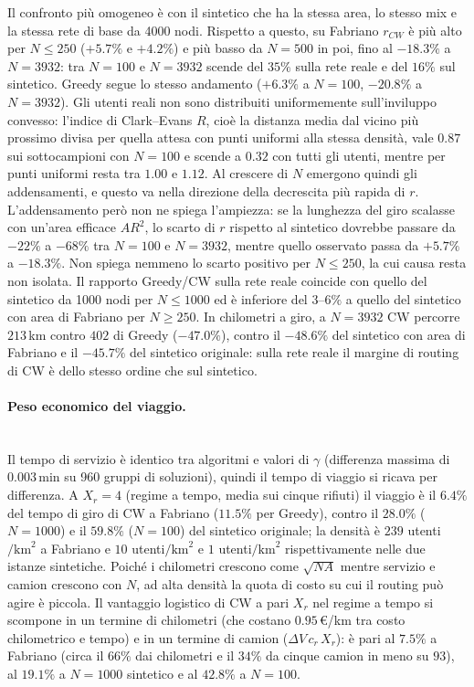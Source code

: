 Il confronto più omogeneo è con il sintetico che ha la stessa area, lo stesso mix e la stessa rete di base da 4000 nodi. Rispetto a questo, su Fabriano $r_{CW}$ è più alto per $N\le250$ ($+5.7\%$ e $+4.2\%$) e più basso da $N=500$ in poi, fino al $-18.3\%$ a $N=3932$: tra $N=100$ e $N=3932$ scende del $35\%$ sulla rete reale e del $16\%$ sul sintetico. Greedy segue lo stesso andamento ($+6.3\%$ a $N=100$, $-20.8\%$ a $N=3932$). Gli utenti reali non sono distribuiti uniformemente sull'inviluppo convesso: l'indice di Clark--Evans $R$, cioè la distanza media dal vicino più prossimo divisa per quella attesa con punti uniformi alla stessa densità, vale $0.87$ sui sottocampioni con $N=100$ e scende a $0.32$ con tutti gli utenti, mentre per punti uniformi resta tra $1.00$ e $1.12$. Al crescere di $N$ emergono quindi gli addensamenti, e questo va nella direzione della decrescita più rapida di $r$. L'addensamento però non ne spiega l'ampiezza: se la lunghezza del giro scalasse con un'area efficace $A R^2$, lo scarto di $r$ rispetto al sintetico dovrebbe passare da $-22\%$ a $-68\%$ tra $N=100$ e $N=3932$, mentre quello osservato passa da $+5.7\%$ a $-18.3\%$. Non spiega nemmeno lo scarto positivo per $N\le250$, la cui causa resta non isolata. Il rapporto Greedy/CW sulla rete reale coincide con quello del sintetico da 1000 nodi per $N\le1000$ ed è inferiore del $3$--$6\%$ a quello del sintetico con area di Fabriano per $N\ge250$. In chilometri a giro, a $N=3932$ CW percorre $213$\,km contro $402$ di Greedy ($-47.0\%$), contro il $-48.6\%$ del sintetico con area di Fabriano e il $-45.7\%$ del sintetico originale: sulla rete reale il margine di routing di CW è dello stesso ordine che sul sintetico.

\paragraph{Peso economico del viaggio.}\mbox{}\\
Il tempo di servizio è identico tra algoritmi e valori di $\gamma$ (differenza massima di $0.003$\,min su 960 gruppi di soluzioni), quindi il tempo di viaggio si ricava per differenza. A $X_r=4$ (regime a tempo, media sui cinque rifiuti) il viaggio è il $6.4\%$ del tempo di giro di CW a Fabriano ($11.5\%$ per Greedy), contro il $28.0\%$ ($N=1000$) e il $59.8\%$ ($N=100$) del sintetico originale; la densità è $239$ utenti$/\mathrm{km}^2$ a Fabriano e $10$ utenti$/\mathrm{km}^2$ e $1$ utenti$/\mathrm{km}^2$ rispettivamente nelle due istanze sintetiche. Poiché i chilometri crescono come $\sqrt{N A}$ mentre servizio e camion crescono con $N$, ad alta densità la quota di costo su cui il routing può agire è piccola. Il vantaggio logistico di CW a pari $X_r$ nel regime a tempo si scompone in un termine di chilometri (che costano $0.95$\,\euro/km tra costo chilometrico e tempo) e in un termine di camion ($\Delta V\,c_r\,X_r$): è pari al $7.5\%$ a Fabriano (circa il $66\%$ dai chilometri e il $34\%$ da cinque camion in meno su $93$), al $19.1\%$ a $N=1000$ sintetico e al $42.8\%$ a $N=100$.

